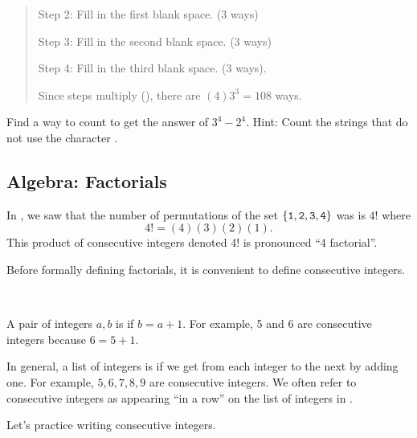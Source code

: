 \begin{act}
\begin{actpart}
\begin{quote}
            Step 2: Fill in the first blank space. (3 ways) 
         
            Step 3: Fill in the second blank space. (3 ways)  
         
            Step 4: Fill in the third blank space. (3 ways).  
         
            Since steps multiply (), there are $(4)3^3 = 108$ ways.
        \end{quote}
    
        \item Find a way to count to get the answer of $3^4-2^4$. Hint: Count the strings that do not use the character .
    \end{actpart}
\end{act}


\newcommand{\subfactorials}{Algebra: Factorials}
\subsection{\subfactorials}
\label{sub_factorials}

In , we saw that the number of permutations of the set $\{\texttt{1},\texttt{2},\texttt{3},\texttt{4}\}$ was is $4!$ where
$$4!=(4)(3)(2)(1).$$ 
This product of consecutive integers denoted 4! is pronounced ``4 factorial''.  

Before formally defining factorials, it is convenient to define consecutive integers.

\begin{defn} 
\label{defn_consecutive_integers}
~
    \begin{apart}
        \item  A pair of integers $a,b$ is  if $b=a+1$.  For example, 5 and 6 are consecutive integers because $6=5+1$. 
        \item In general, a list of integers is  if we get from each integer to the next by adding one.  For example, $5,6,7,8,9$ are consecutive integers.  We often refer to consecutive integers as appearing ``in a row'' on the list of integers in . 
    \end{apart}

\end{defn}

Let's practice writing consecutive integers.  

